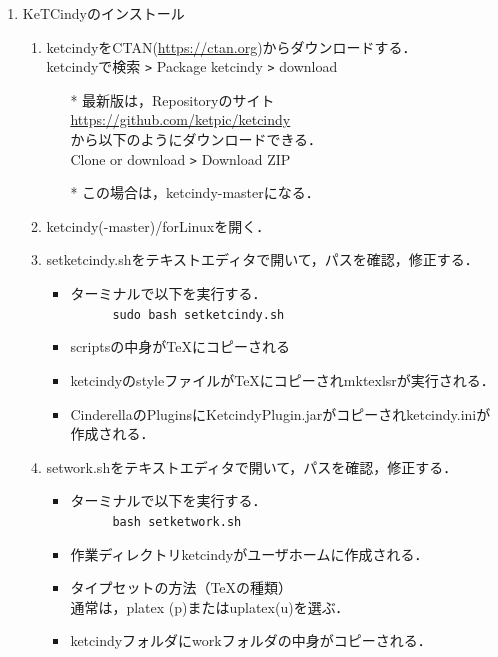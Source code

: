 \documentclass{ujarticle}
\begin{document}
\begin{enumerate}[\bf\large 1.]
\item KeTCindyのインストール
  \begin{enumerate}[(1)]
  \item ketcindyをCTAN(\url{https://ctan.org})からダウンロードする．\\
  \hspace*{10mm}ketcindyで検索 \verb|>| Package ketcindy \verb|>| download
    \begin{itemize}
    \item[*]最新版は，Repositoryのサイト\\
        \hspace*{10mm}\url{https://github.com/ket­pic/ketcindy}\\
       から以下のようにダウンロードできる．\\
        \hspace*{10mm}Clone or download \verb|>| Download ZIP
    \item[*]この場合は，ketcindy-masterになる．
    \end{itemize}
  \item ketcindy(-master)/forLinuxを開く．
  \item setketcindy.shをテキストエディタで開いて，パスを確認，修正する．
    \begin{itemize}
    \item ターミナルで以下を実行する．\\
　　　\verb|sudo bash setketcindy.sh|
    \item scriptsの中身が\TeX にコピーされる
    \item ketcindyのstyleファイルが\TeX にコピーされmktexlsrが実行される．
    \item CinderellaのPluginsにKetcindyPlugin.jarがコピーされketcindy.iniが作成される．
    \end{itemize}
  \item setwork.shをテキストエディタで開いて，パスを確認，修正する．
    \begin{itemize}
    \item ターミナルで以下を実行する．\\
　　　\verb|bash setketwork.sh|
    \item 作業ディレクトリketcindyがユーザホームに作成される．
    \item タイプセットの方法（\TeX の種類）\\
    \hspace*{10mm}通常は，platex (p)またはuplatex(u)を選ぶ．
    \item ketcindyフォルダにworkフォルダの中身がコピーされる．

\end{itemize}
\end{enumerate}
\end{enumerate}
\end{document}
